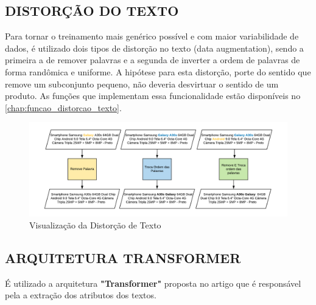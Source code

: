 \subsection{DISTORÇÃO DO TEXTO}
\label{distorcao_de_texto_chap}

Para tornar o treinamento mais genérico possível e com maior variabilidade de dados, é utilizado dois tipos de distorção no texto (data augmentation), sendo a primeira a de remover palavras e a segunda de inverter a ordem de palavras de forma randômica e uniforme. A hipótese para esta distorção, porte do sentido que remove um subconjunto pequeno, não deveria desvirtuar o sentido de um produto. As funções que implementam essa funcionalidade estão disponíveis no \autoref{chap:funcao_distorcao_texto}.

\begin{figure}[]
	\caption{\label{distorcao_de_texto} Visualização da Distorção de Texto}
	\begin{center}
	    \includegraphics[width=\textwidth]{artigo/recursos/imagens/distorcao_de_texto.png}
	\end{center}
\end{figure}

\subsection{ARQUITETURA TRANSFORMER}

É utilizado a arquitetura \textbf{"Transformer"} proposta no artigo \cite{transformer} que é responsável pela a extração dos atributos dos textos.

